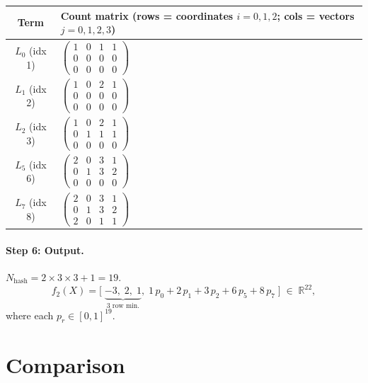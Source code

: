\documentclass[11pt,a4paper]{article}
\newcommand{\R}{\mathbb{R}}
\begin{document}
\medskip
\begin{center}
\small
\renewcommand{\arraystretch}{1.1}
\begin{tabular}{cl}
  \toprule
  Term & Count matrix (rows = coordinates $i{=}0,1,2$;\; cols = vectors $j{=}0,1,2,3$) \\
  \midrule
  $L_0$ (idx 1) & $\begin{pmatrix}1&0&1&1\\0&0&0&0\\0&0&0&0\end{pmatrix}$ \\[8pt]
  $L_1$ (idx 2) & $\begin{pmatrix}1&0&2&1\\0&0&0&0\\0&0&0&0\end{pmatrix}$ \\[8pt]
  $L_2$ (idx 3) & $\begin{pmatrix}1&0&2&1\\0&1&1&1\\0&0&0&0\end{pmatrix}$ \\[8pt]
  $L_5$ (idx 6) & $\begin{pmatrix}2&0&3&1\\0&1&3&2\\0&0&0&0\end{pmatrix}$ \\[8pt]
  $L_7$ (idx 8) & $\begin{pmatrix}2&0&3&1\\0&1&3&2\\2&0&1&1\end{pmatrix}$ \\
  \bottomrule
\end{tabular}
\end{center}

\paragraph{Step 6: Output.}
$N_{\text{hash}} = 2 \times 3 \times 3 + 1 = 19$.
\[
  f_2(X) = \bigl[\;\underbrace{-3,\;2,\;1}_{3\text{ row min.}},\;
                  1\,p_0 + 2\,p_1 + 3\,p_2 + 6\,p_5 + 8\,p_7\;\bigr]
  \;\in\; \R^{22},
\]
where each $p_r \in [0,1]^{19}$.


\section{Comparison}
\label{sec:comparison}
\end{document}
